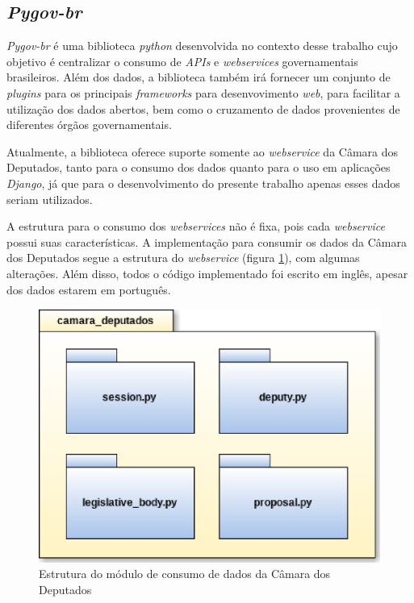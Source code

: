 \subsection{\textit{Pygov-br}}

\textit{Pygov-br} é uma biblioteca \textit{python} desenvolvida no contexto desse trabalho cujo objetivo é centralizar o consumo de \textit{APIs} e \textit{webservices} governamentais brasileiros. Além dos dados, a biblioteca também irá fornecer um conjunto de \textit{plugins} para os principais \textit{frameworks} para desenvovimento \textit{web}, para facilitar a utilização dos dados abertos, bem como o cruzamento de dados provenientes de diferentes órgãos governamentais.

Atualmente, a biblioteca oferece suporte somente ao \textit{webservice} da Câmara dos Deputados, tanto para o consumo dos dados quanto para o uso em aplicações \textit{Django}, já que para o desenvolvimento do presente trabalho apenas esses dados seriam utilizados.

A estrutura para o consumo dos \textit{webservices} não é fixa, pois cada \textit{webservice} possui suas características. A implementação para consumir os dados da Câmara dos Deputados segue a estrutura do \textit{webservice} (figura \ref{estrutua_camara_deputados}), com algumas alterações. Além disso, todos o código implementado foi escrito em inglês, apesar dos dados estarem em português.

\begin{figure}[h]
    \centering
    \includegraphics[scale=0.5]{figuras/camara_deputados.eps}
    \caption{Estrutura do módulo de consumo de dados da Câmara dos Deputados}
    \label{estrutua_camara_deputados}
\end{figure}


